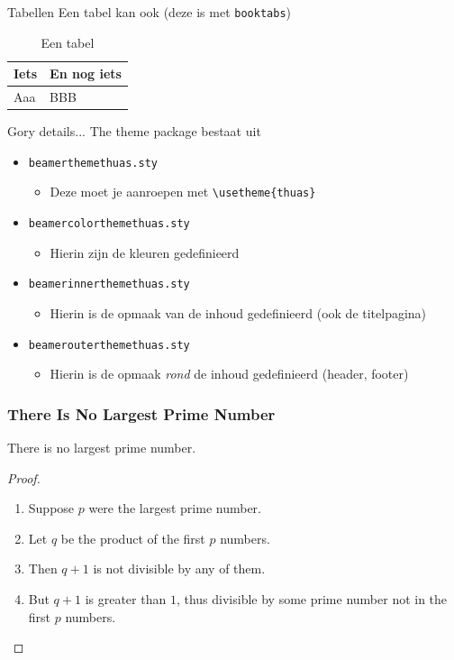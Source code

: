 \documentclass[fleqn,aspectratio=169,dutch]{beamer}
\begin{document}
\begin{frame}{Tabellen}
Een tabel kan ook (deze is met \texttt{booktabs})

\begin{table}[!ht]
\caption{Een tabel}
\begin{tabular}{ll}
\toprule
Iets & En nog iets\\
\midrule
Aaa & BBB\\
\bottomrule
\end{tabular}
\end{table}
\end{frame}

\begin{frame}[fragile]{Gory details...}
The theme package bestaat uit
\begin{itemize}
\item \texttt{beamerthemethuas.sty}
\begin{itemize}
\item Deze moet je aanroepen met \lstinline|\usetheme{thuas}|
\end{itemize}
\item \texttt{beamercolorthemethuas.sty}
\begin{itemize}
\item Hierin zijn de kleuren gedefinieerd
\end{itemize}
\item \texttt{beamerinnerthemethuas.sty}
\begin{itemize}
\item Hierin is de opmaak van de inhoud gedefinieerd (ook de titelpagina)
\end{itemize}
\item \texttt{beamerouterthemethuas.sty}
\begin{itemize}
\item Hierin is de opmaak \emph{rond} de inhoud gedefinieerd (header, footer)
\end{itemize}
\end{itemize}
\end{frame}

\begin{frame} 
\frametitle{There Is No Largest Prime Number} 
\begin{theorem}
There is no largest prime number.
\end{theorem} 
\begin{proof}
\begin{enumerate} 
\item<1-| alert@1> Suppose $p$ were the largest prime number. 
\item<2-> Let $q$ be the product of the first $p$ numbers. 
\item<3-> Then $q+1$ is not divisible by any of them. 
\item<1-> But $q + 1$ is greater than $1$, thus divisible by some prime
number not in the first $p$ numbers.
\end{enumerate}
\end{proof}
\end{frame}
\end{document}
